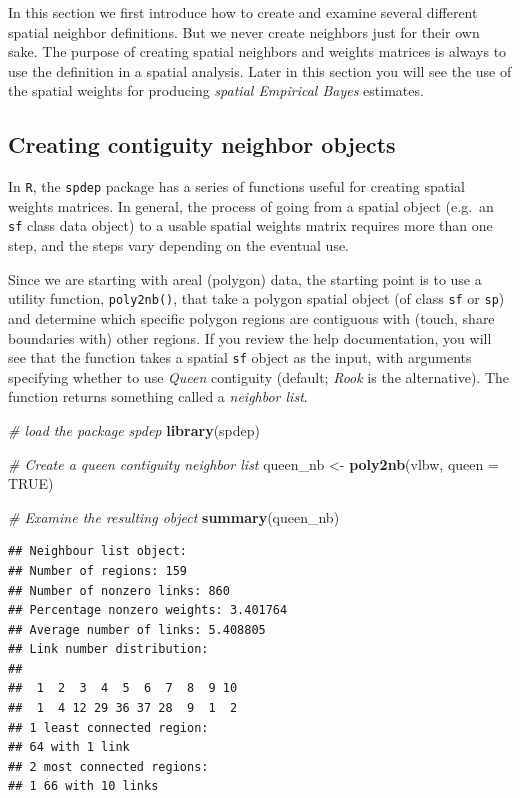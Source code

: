 \documentclass[
]{book}
\newenvironment{Shaded}{\begin{snugshade}}{\end{snugshade}}
\newcommand{\AttributeTok}[1]{\textcolor[rgb]{0.13,0.29,0.53}{#1}}
\newcommand{\CommentTok}[1]{\textcolor[rgb]{0.56,0.35,0.01}{\textit{#1}}}
\newcommand{\ConstantTok}[1]{\textcolor[rgb]{0.56,0.35,0.01}{#1}}
\newcommand{\FunctionTok}[1]{\textcolor[rgb]{0.13,0.29,0.53}{\textbf{#1}}}
\newcommand{\NormalTok}[1]{#1}
\newcommand{\OtherTok}[1]{\textcolor[rgb]{0.56,0.35,0.01}{#1}}
\begin{document}
In this section we first introduce how to create and examine several different spatial neighbor definitions. But we never create neighbors just for their own sake. The purpose of creating spatial neighbors and weights matrices is always to use the definition in a spatial analysis. Later in this section you will see the use of the spatial weights for producing \emph{spatial Empirical Bayes} estimates.

\hypertarget{creating-contiguity-neighbor-objects}{%
\subsection{Creating contiguity neighbor objects}\label{creating-contiguity-neighbor-objects}}

In \texttt{R}, the \texttt{spdep} package has a series of functions useful for creating spatial weights matrices. In general, the process of going from a spatial object (e.g.~an \texttt{sf} class data object) to a usable spatial weights matrix requires more than one step, and the steps vary depending on the eventual use.

Since we are starting with areal (polygon) data, the starting point is to use a utility function, \texttt{poly2nb()}, that take a polygon spatial object (of class \texttt{sf} or \texttt{sp}) and determine which specific polygon regions are contiguous with (touch, share boundaries with) other regions. If you review the help documentation, you will see that the function takes a spatial \texttt{sf} object as the input, with arguments specifying whether to use \emph{Queen} contiguity (default; \emph{Rook} is the alternative). The function returns something called a \emph{neighbor list}.

\begin{Shaded}
\begin{Highlighting}[]
\CommentTok{\# load the package spdep}
\FunctionTok{library}\NormalTok{(spdep)}

\CommentTok{\# Create a queen contiguity neighbor list}
\NormalTok{queen\_nb }\OtherTok{\textless{}{-}} \FunctionTok{poly2nb}\NormalTok{(vlbw, }\AttributeTok{queen =} \ConstantTok{TRUE}\NormalTok{)}

\CommentTok{\# Examine the resulting object}
\FunctionTok{summary}\NormalTok{(queen\_nb)}
\end{Highlighting}
\end{Shaded}

\begin{verbatim}
## Neighbour list object:
## Number of regions: 159 
## Number of nonzero links: 860 
## Percentage nonzero weights: 3.401764 
## Average number of links: 5.408805 
## Link number distribution:
## 
##  1  2  3  4  5  6  7  8  9 10 
##  1  4 12 29 36 37 28  9  1  2 
## 1 least connected region:
## 64 with 1 link
## 2 most connected regions:
## 1 66 with 10 links
\end{verbatim}
\end{document}
